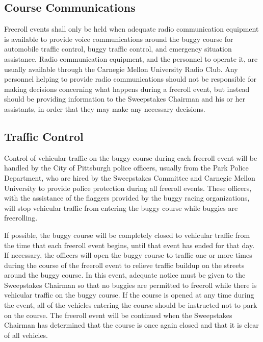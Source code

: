 \subsection{Course Communications}

	Freeroll events shall only be held when adequate radio communication
	equipment is available to provide voice communications around the buggy course
	for automobile traffic control, buggy traffic control, and emergency situation
	assistance. Radio communication equipment, and the personnel to operate it, are
	usually available through the Carnegie Mellon University Radio Club. Any
	personnel helping to provide radio communications should not be responsible for
	making decisions concerning what happens during a freeroll event, but
	instead should be providing information to the Sweepstakes Chairman and his or
	her assistants, in order that they may make any necessary decisions.
	
	
\subsection{Traffic Control}

	Control of vehicular traffic on the buggy course during each freeroll event
	will be handled by the City of Pittsburgh police officers, usually from
	the Park Police Department, who are hired by the Sweepstakes Committee and
	Carnegie Mellon University to provide police protection during all freeroll
	events. These officers, with the assistance of the flaggers provided
	by the buggy racing organizations, will stop vehicular traffic from entering
	the buggy course while buggies are freerolling.

	If possible, the buggy course will be completely closed to vehicular traffic
	from the time that each freeroll event begins, until that event
	has ended for that day. If necessary, the officers will open the buggy course
	to traffic one or more times during the course of the freeroll event
	to relieve traffic buildup on the streets around the buggy course. In this
	event, adequate notice must be given to the Sweepstakes Chairman so that no
	buggies are permitted to freeroll while there is vehicular traffic on the buggy
	course. If the course is opened at any time during the event, all of
	the vehicles entering the course should be instructed not to park on the
	course. The freeroll event will be continued when the Sweepstakes Chairman has
	determined that the course is once again closed and that it is clear of all
	vehicles.
	
